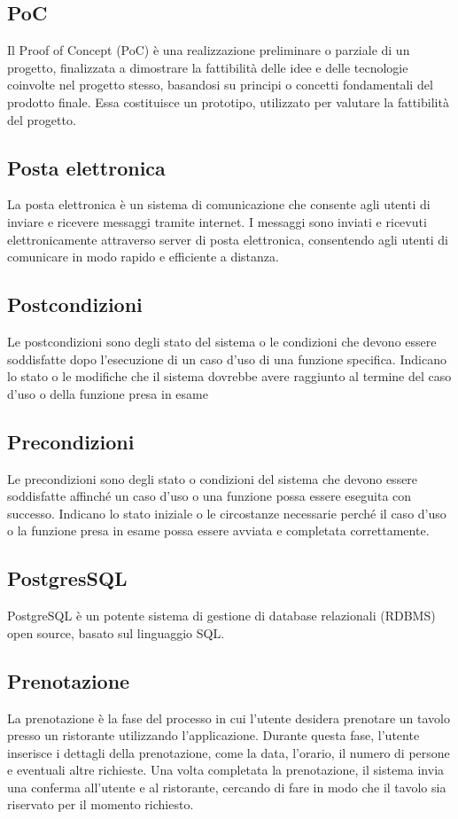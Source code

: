 \subsection*{PoC} 
Il  Proof of Concept (PoC) è una realizzazione preliminare o parziale di un progetto, finalizzata a dimostrare la fattibilità delle idee e delle tecnologie coinvolte nel progetto stesso, basandosi su principi o concetti fondamentali del prodotto finale. Essa costituisce un prototipo, utilizzato per valutare la fattibilità del progetto. 
\subsection*{Posta elettronica} 
La posta elettronica è un sistema di comunicazione che consente agli utenti di inviare e ricevere messaggi tramite internet. I messaggi sono inviati e ricevuti elettronicamente attraverso server di posta elettronica, consentendo agli utenti di comunicare in modo rapido e efficiente a distanza. 
\subsection*{Postcondizioni} 
Le postcondizioni sono degli stato del sistema o le condizioni che devono essere soddisfatte dopo l'esecuzione di un caso d'uso di una funzione specifica. Indicano lo stato o le modifiche che il sistema dovrebbe avere raggiunto al termine del caso d'uso o della funzione presa in esame 
\subsection*{Precondizioni} 
Le precondizioni sono degli stato o condizioni del sistema che devono essere soddisfatte affinché un caso d'uso o una funzione possa essere eseguita con successo. Indicano lo stato iniziale o le circostanze necessarie perché il caso d'uso o la funzione presa in esame possa essere avviata e completata correttamente. 
\subsection*{PostgresSQL} 
PostgreSQL è un potente sistema di gestione di database relazionali (RDBMS) open source, basato sul linguaggio SQL.
\subsection*{Prenotazione} 
La prenotazione è la fase del processo in cui l'utente desidera prenotare un tavolo presso un ristorante utilizzando l'applicazione. Durante questa fase, l'utente inserisce i dettagli della prenotazione, come la data, l'orario, il numero di persone e eventuali altre richieste. Una volta completata la prenotazione, il sistema invia una conferma all'utente e al ristorante, cercando di fare in modo che il tavolo sia riservato per il momento richiesto. 
